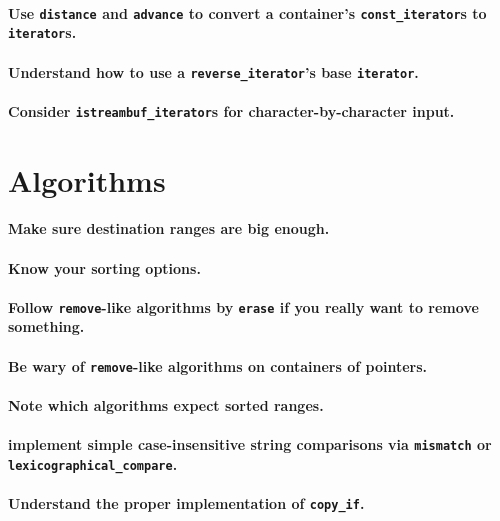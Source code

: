 \documentclass{article}
\begin{document}
\paragraph{Use {\tt distance} and {\tt advance} to convert a container's {\tt const\_iterator}s to {\tt iterator}s.}
\paragraph{Understand how to use a {\tt reverse\_iterator}'s base {\tt iterator}.}
\paragraph{Consider {\tt istreambuf\_iterator}s for character-by-character input.}

\section{Algorithms}

\paragraph{Make sure destination ranges are big enough.}
\paragraph{Know your sorting options.}
\paragraph{Follow {\tt remove}-like algorithms by {\tt erase} if you really want to remove something.}
\paragraph{Be wary of {\tt remove}-like algorithms on containers of pointers.}
\paragraph{Note which algorithms expect sorted ranges.}
\paragraph{implement simple case-insensitive string comparisons via {\tt mismatch} or {\tt lexicographical\_compare}.}
\paragraph{Understand the proper implementation of {\tt copy\_if}.}
\end{document}
